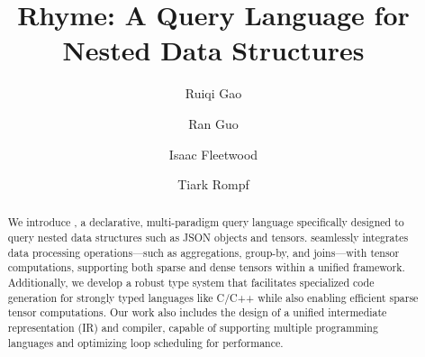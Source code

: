 \documentclass[acmsmall,nonacm]{acmart}\settopmatter{printfolios=true,printccs=false,printacmref=false}
\newcommand{\rhyme}{\text{Rhyme}\xspace}
\begin{document}
\sloppy

\title{Rhyme: A Query Language for Nested Data Structures}

\author{Ruiqi Gao}
\author{Ran Guo}
\author{Isaac Fleetwood}
\author{Tiark Rompf}

\begin{abstract}

We introduce \rhyme, a declarative, multi-paradigm query language specifically designed to query nested data structures such as JSON objects and tensors. \rhyme seamlessly integrates data processing operations—such as aggregations, group-by, and joins—with tensor computations, supporting both sparse and dense tensors within a unified framework. Additionally, we develop a robust type system that facilitates specialized code generation for strongly typed languages like C/C++ while also enabling efficient sparse tensor computations. Our work also includes the design of a unified intermediate representation (IR) and compiler, capable of supporting multiple programming languages and optimizing loop scheduling for performance.
\end{abstract}
\end{document}

